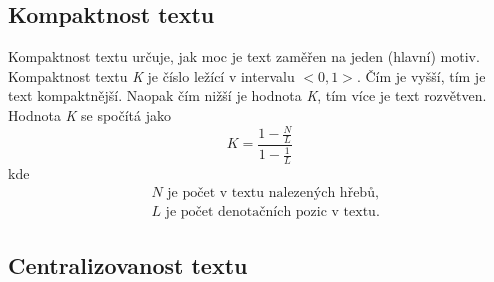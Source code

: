 \documentclass[dp.tex]{subfiles}
\begin{document}
\subsection{Kompaktnost textu}
Kompaktnost textu určuje, jak moc je text zaměřen na jeden (hlavní) motiv. Kompaktnost textu \textit{K} je číslo ležící v intervalu $<0,1>$. Čím je vyšší, tím je text kompaktnější. Naopak čím nižší je hodnota \textit{K}, tím více je text rozvětven. Hodnota \textit{K} se spočítá jako
\begin{equation}
K=\frac{1-\frac{N}{L}}{1-\frac{1}{L}}
\end{equation}
kde 
\begin{align*}
      & N\text{ je počet v textu nalezených hřebů,}\\
      & L\text{ je počet denotačních pozic v textu.}
\end{align*}     

\subsection{Centralizovanost textu}
\end{document}
